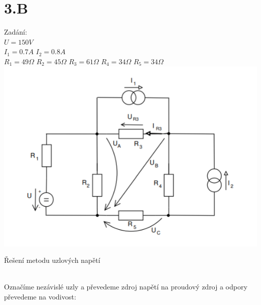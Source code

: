 \documentclass[11pt]{article}
\begin{document}
\section*{3.B}
Zadání:\\
$U = 150V$\\
$I_1 = 0.7A$
$I_2 = 0.8A$\\
$R_1 = 49\Omega$
$R_2 = 45\Omega$
$R_3 = 61\Omega$
$R_4 = 34\Omega$
$R_5 = 34\Omega$\\
\includegraphics[width=1\linewidth]{priklad3_zadani.png}\\
\centerline{\huge{Řešení metodu uzlových napětí}}\\
\newpage
Označíme nezávislé uzly a převedeme zdroj napětí na proudový zdroj a odpory převedeme na vodivost:\\
\end{document}
